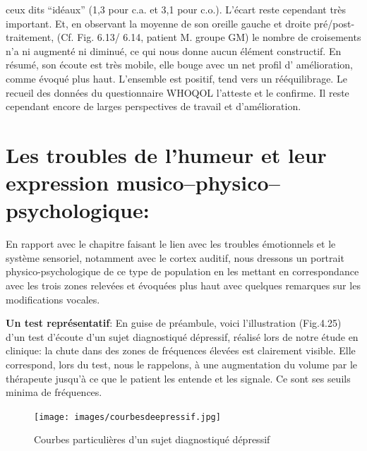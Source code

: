   ceux dits ``idéaux''  (1,3 pour c.a. et 3,1 pour c.o.). L'écart reste cependant très important. %
  Et, en observant la moyenne de son oreille gauche et droite
  pré/post-traitement, (Cf. Fig. 6.13/ 6.14, patient M. groupe GM)  le
  nombre de croisements n'a ni augmenté ni diminué, ce qui nous donne
  aucun élément constructif.
  En résumé, son écoute est très mobile, elle bouge avec un net profil d'
  amélioration, comme évoqué plus haut. L'ensemble est positif, tend vers un
  rééquilibrage. Le recueil des données du
  questionnaire WHOQOL l'atteste et le confirme. 
  Il reste cependant encore de larges perspectives de travail et d'amélioration.
 
  
     







 




   
  \section{Les troubles de l'humeur et leur expression
    musico--physico--psychologique:}
 En rapport  avec le chapitre faisant le lien avec les troubles
 émotionnels et le
système sensoriel, notamment avec le cortex auditif, nous
dressons un portrait
physico-psychologique de ce type de population 
  en les mettant en correspondance avec les trois zones relevées et
  évoquées plus haut avec quelques remarques sur 
  les modifications vocales.

  \textbf{Un test représentatif}: 
En guise de préambule, voici l'illustration (Fig.4.25) d'un test
d'écoute d'un sujet diagnostiqué dépressif, réalisé lors de notre
étude en clinique: la
chute dans des zones de fréquences élevées est
clairement visible. Elle correspond, lors du test, nous le rappelons, à une augmentation
du volume 
par le thérapeute jusqu'à ce que le patient les entende et les signale.
Ce sont ses seuils minima de fréquences.
 \begin{figure}[ht]
	\centering
	\texttt{[image: images/courbesdeepressif.jpg]}
	\caption{Courbes particulières d'un sujet diagnostiqué dépressif}
	\label{fig:courbes du dépressif}
      \end{figure}




